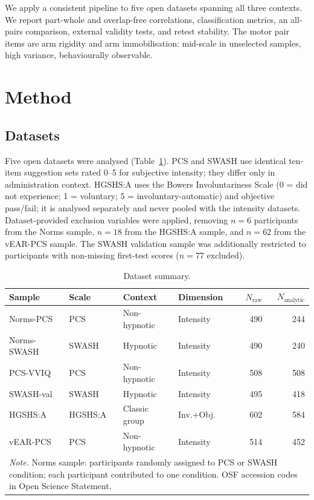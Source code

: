 \documentclass[12pt,a4paper]{article}
\begin{document}
We apply a consistent pipeline to five open datasets spanning all three
contexts. We report part-whole and overlap-free correlations, classification
metrics, an all-pairs comparison, external validity tests, and retest
stability. The motor pair items are arm rigidity and arm immobilisation:
mid-scale in unselected samples, high variance, behaviourally observable.


\section{Method}

\subsection{Datasets}

Five open datasets were analysed (Table~\ref{tab:datasets}). PCS and SWASH
use identical ten-item suggestion sets rated 0--5 for subjective intensity;
they differ only in administration context. HGSHS:A uses the Bowers Involuntariness Scale
\citep{bowers1981suggestion} (0 = did not experience; 1 = voluntary;
5 = involuntary-automatic) and objective pass/fail; it
is analysed separately and never pooled with the intensity datasets.
Dataset-provided exclusion variables were applied, removing $n = 6$
participants from the Norms sample, $n = 18$ from the HGSHS:A sample, and
$n = 62$ from the vEAR-PCS sample. The SWASH validation sample was
additionally restricted to participants with non-missing first-test scores
($n = 77$ excluded).

\begin{table}[ht]
\centering
\caption{Dataset summary.}
\label{tab:datasets}
\footnotesize
\begin{tabular}{llllrr}
\toprule
Sample & Scale & Context & Dimension & $N_{\text{raw}}$ & $N_{\text{analytic}}$ \\
\midrule
Norms-PCS   & PCS     & Non-hypnotic  & Intensity   & 490 & 244 \\
Norms-SWASH & SWASH   & Hypnotic      & Intensity   & 490 & 240 \\
PCS-VVIQ    & PCS     & Non-hypnotic  & Intensity   & 508 & 508 \\
SWASH-val   & SWASH   & Hypnotic      & Intensity   & 495 & 418 \\
HGSHS:A     & HGSHS:A & Classic group & Inv.+Obj.   & 602 & 584 \\
vEAR-PCS    & PCS     & Non-hypnotic  & Intensity   & 514 & 452 \\
\bottomrule
\multicolumn{6}{l}{\parbox{11cm}{\textit{Note.} Norms sample: participants randomly assigned to PCS or SWASH condition; each participant contributed to one condition. OSF accession codes in Open Science Statement.}}\\
\end{tabular}
\end{table}
\end{document}
